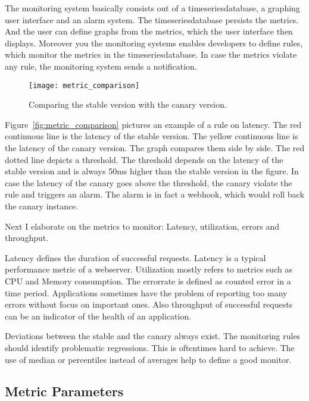 The monitoring system basically consists out of a timeseriesdatabase, a graphing user
interface and an alarm system. The timeseriesdatabase persists the metrics. And the user
can define graphs from the metrics, which the user interface then displays. Moreover you
the monitoring systems enables developers to define rules, which monitor the metrics in
the timeseriesdatabase. In case the metrics violate any rule, the monitoring system sends
a notification.

\begin{figure}[htbp]
  \centering
  \texttt{[image: metric\_comparison]}
  \caption[metric_comparison]{Comparing the stable version with the canary version.}
  \label{fig:metrics_comparison}
\end{figure}

Figure~\ref{fig:metric_comparison} pictures an example of a rule on latency. The red
continuous line is the latency of the stable version. The yellow continuous line is the
latency of the canary version. The graph compares them side by side. The red dotted line
depicts a threshold. The threshold depends on the latency of the stable version and is
always 50ms higher than the stable version in the figure. In case the latency of the
canary goes above the threshold, the canary violate the rule and triggers an alarm. The
alarm is in fact a webhook, which would roll back the canary instance.

Next I elaborate on the metrics to monitor: Latency, utilization, errors and throughput.

Latency defines the duration of successful requests. Latency is a typical performance
metric of a webserver. Utilization mostly refers to metrics such as CPU and Memory
consumption. The errorrate is defined as counted error in a time period. Applications
sometimes have the problem of reporting too many errors without focus on important
ones. Also throughput of successful requests can be an indicator of the health of an
application.

Deviations between the stable and the canary always exist. The monitoring rules should
identify problematic regressions. This is oftentimes hard to achieve. The use of median or
percentiles instead of averages help to define a good monitor.

\subsection{Metric Parameters}

